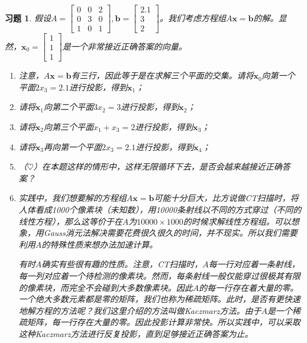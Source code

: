 \documentclass[UTF8]{ctexart}
\newtheorem{ex}[thm]{习题}
\begin{document}
\begin{ex}
假设$A=\begin{bmatrix}0&0&2\\0&3&0\\1&0&1\end{bmatrix},\bm b=\begin{bmatrix}2.1\\3\\2\end{bmatrix}$。我们考虑方程组$A\bm x=\bm b$的解。显然，$\bm x_0=\begin{bmatrix}1\\1\\1\end{bmatrix}$是一个非常接近正确答案的向量。
\begin{enumerate}
\item 注意，$A\bm x=\bm b$有三行，因此等于是在求解三个平面的交集。请将$\bm x_0$向第一个平面$2x_3=2.1$进行投影，得到$\bm x_1$；
\item 请将$\bm x_1$向第二个平面$3x_2=3$进行投影，得到$\bm x_2$；
\item 请将$\bm x_2$向第三个平面$x_1+x_3=2$进行投影，得到$\bm x_3$；
\item 请将$\bm x_3$再向第一个平面$2x_3=2.1$进行投影，得到$\bm x_4$；
\item （$\heartsuit $）在本题这样的情形中，这样无限循环下去，是否会越来越接近正确答案？
\item[注记：] 实践中，我们想要解的方程组$A\bm x=\bm b$可能十分巨大，比方说做CT扫描时，将人体看成1000个像素块（未知数），用10000条射线以不同的方式穿过（不同的线性方程），那么这等价于在$A$为$10000\times 1000$的时候求解线性方程组。可以想象，用Gauss消元法解决需要花费很久很久的时间，并不现实。所以我们需要利用$A$的特殊性质来想办法加速计算。

有时$A$确实有些很有趣的性质。注意，CT扫描时，$A$每一行对应着一条射线，每一列对应着一个待检测的像素块。然而，每条射线一般仅能穿过很极其有限的像素块，而完全不会碰到大多数像素块。因此$A$的每一行存在着大量的零。一个绝大多数元素都是零的矩阵，我们也称为稀疏矩阵。此时，是否有更快速地解方程的方法呢？我们这里介绍的方法叫做Kaczmarz方法。由于$A$是一个稀疏矩阵，每一行存在大量的零。因此投影计算非常快。所以实践中，可以采取这种Kaczmarz方法进行反复投影，直到足够接近正确答案为止。
\end{enumerate}
\end{ex}
\end{document}
